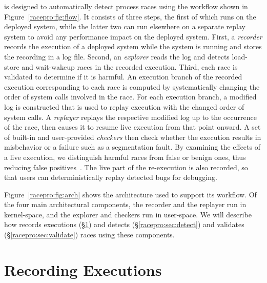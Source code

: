 \racepro is designed to automatically detect process races using the
workflow shown in Figure~\ref{racepro:fig:flow}.  
It consists of three steps,
the first of which runs on the deployed system, while the latter two can run
elsewhere on a separate replay system to avoid any performance
impact on the deployed system.
First, a \emph{recorder} records the execution of a deployed system
while the system is running and stores the recording in a log file.  Second,
an \emph{explorer} reads the log and detects load-store and wait-wakeup races
in the recorded execution.  Third, each race is validated to determine if
it is harmful.  An execution branch of the recorded execution
corresponding to each race is computed by systematically changing the
order of system calls involved in the race.  For each
execution branch, a modified log is constructed that is used to replay 
execution with the changed order of system calls.  A 
\emph{replayer} replays the respective modified log up to the
occurrence of the race, then causes it to resume live execution from
that point onward.  A set of built-in and user-provided \emph{checkers}
then check whether the execution results in misbehavior or a failure
such as a segmentation fault.  By examining the effects of a live
execution, we distinguish harmful races from false or benign ones,
thus reducing false
positives~\cite{pinsel:pldi07,racefuzzer:pldi08}. The live part 
of the re-execution is also recorded, so that users can
deterministically replay detected bugs for debugging.

Figure~\ref{racepro:fig:arch} shows the \racepro architecture used to support its
workflow.  Of the four main architectural components, the recorder
and the replayer run in kernel-space, and the explorer and checkers
run in user-space.  We will describe how \racepro records executions
(\S\ref{racepro:sec:record}) and detects (\S\ref{racepro:sec:detect}) and validates
(\S\ref{racepro:sec:validate}) races using these components.  

\section{Recording Executions} \label{racepro:sec:record}

